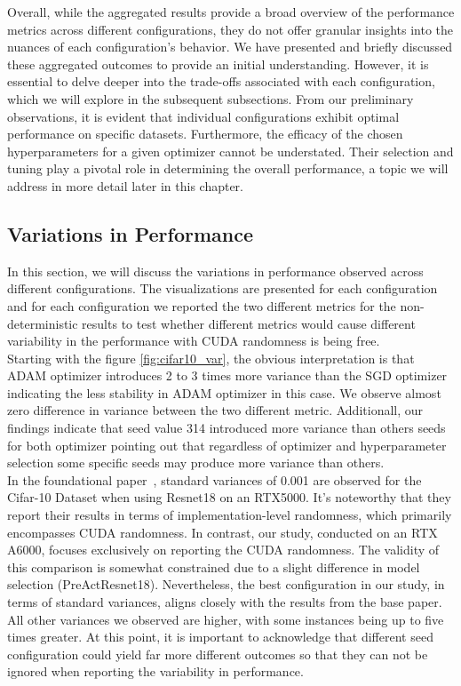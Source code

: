 Overall, while the aggregated results provide a broad overview of the performance metrics across different configurations, they do not offer granular insights into the nuances of each configuration's behavior. We have presented and briefly discussed these aggregated outcomes to provide an initial understanding. However, it is essential to delve deeper into the trade-offs associated with each configuration, which we will explore in the subsequent subsections. From our preliminary observations, it is evident that individual configurations exhibit optimal performance on specific datasets. Furthermore, the efficacy of the chosen hyperparameters for a given optimizer cannot be understated. Their selection and tuning play a pivotal role in determining the overall performance, a topic we will address in more detail later in this chapter.

\subsection{Variations in Performance}

In this section, we will discuss the variations in performance observed across different configurations. The visualizations are presented for each configuration and for each configuration we reported the two different metrics for the non-deterministic results to test whether different metrics would cause different variability in the performance with CUDA randomness is being free.\\

Starting with the figure \ref{fig:cifar10_var}, the obvious interpretation is that ADAM optimizer introduces 2 to 3 times more variance than the SGD optimizer indicating the less stability in ADAM optimizer in this case. We observe almost zero difference in variance between the two different metric. Additionall, our findings indicate that seed value 314 introduced more variance than others seeds for both optimizer pointing out that regardless of optimizer and hyperparameter selection some specific seeds may produce more variance than others.\\

In the foundational paper~\cite{zhuang2022randomness}, standard variances of 0.001 are observed for the Cifar-10 Dataset when using Resnet18 on an RTX5000. It's noteworthy that they report their results in terms of implementation-level randomness, which primarily encompasses CUDA randomness. In contrast, our study, conducted on an RTX A6000, focuses exclusively on reporting the CUDA randomness. The validity of this comparison is somewhat constrained due to a slight difference in model selection (PreActResnet18). Nevertheless, the best configuration in our study, in terms of standard variances, aligns closely with the results from the base paper. All other variances we observed are higher, with some instances being up to five times greater. At this point, it is important to acknowledge that different seed configuration could yield far more different outcomes so that they can not be ignored when reporting the variability in performance.\\

